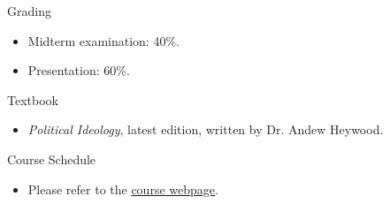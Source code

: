 \documentclass{article}
\begin{document}
\newpage
\begin{flushleft}
Grading \\
\end{flushleft}
\begin{itemize}
\item Midterm examination: 40\%. \\
\item Presentation: 60\%. \\
\end{itemize}
Textbook \\
\begin{itemize}
\item \textit{Political Ideology}, latest edition, written by Dr. Andew Heywood. \\
\end{itemize}
Course Schedule \\
\begin{itemize}
\item Please refer to the \href{https://politics-tchsiao.github.io/political_ideology/}{course webpage}. \\
\end{itemize}
\end{document}
